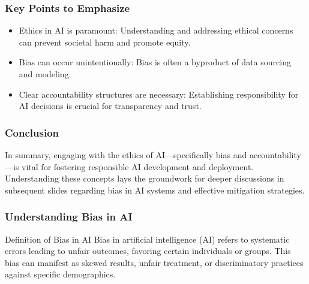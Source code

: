 \documentclass[aspectratio=169]{beamer}
\begin{document}
\begin{frame}[fragile]
    \frametitle{Key Points to Emphasize}
    \begin{itemize}
        \item Ethics in AI is paramount: Understanding and addressing ethical concerns can prevent societal harm and promote equity.
        \item Bias can occur unintentionally: Bias is often a byproduct of data sourcing and modeling.
        \item Clear accountability structures are necessary: Establishing responsibility for AI decisions is crucial for transparency and trust.
    \end{itemize}
\end{frame}

\begin{frame}[fragile]
    \frametitle{Conclusion}
    In summary, engaging with the ethics of AI—specifically bias and accountability—is vital for fostering responsible AI development and deployment. Understanding these concepts lays the groundwork for deeper discussions in subsequent slides regarding bias in AI systems and effective mitigation strategies.
\end{frame}

\begin{frame}[fragile]
    \frametitle{Understanding Bias in AI}
    \begin{block}{Definition of Bias in AI}
        Bias in artificial intelligence (AI) refers to systematic errors leading to unfair outcomes, favoring certain individuals or groups. This bias can manifest as skewed results, unfair treatment, or discriminatory practices against specific demographics.
    \end{block}
\end{frame}
\end{document}
